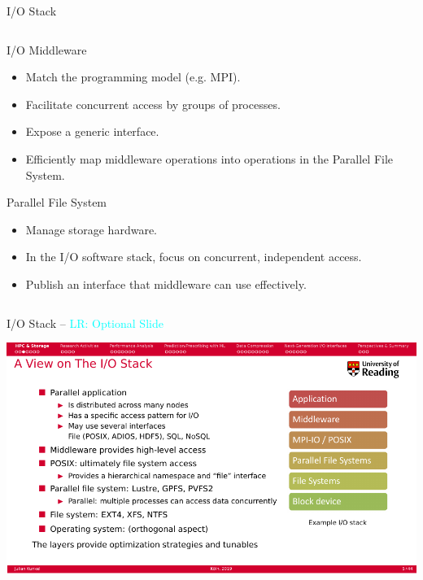 \documentclass[compress,11pt,xcolor=svgnames,aspectratio=169]{beamer}
\newcommand{\lr}[1]{\textcolor{cyan}{LR: #1}}
\begin{document}
\begin{frame}[fragile]{I/O Stack}
{\begin{columns}
\begin{column}{0.38\textwidth}
\begin{block}{I/O Middleware}
\begin{itemize}
\item Match the programming model (e.g. MPI).
\item Facilitate concurrent access by groups of processes.
\item Expose a generic interface.
\item Efficiently map middleware operations into operations in the Parallel File System.
\end{itemize}
\end{block}
\begin{block}{Parallel File System}
\begin{itemize}
\item Manage storage hardware.
\item In the I/O software stack, focus on concurrent, independent access.
\item Publish an interface that middleware can use effectively.
\end{itemize}
\end{block}
\end{column}
\end{columns}

}

\nocite{esiwace}

\end{frame}

\begin{frame}[fragile]{I/O Stack -- \lr{Optional Slide}}

\vspace*{-0.7cm}

\begin{center}
\includegraphics[scale=0.35]{fig/stack2}
\end{center}

\end{frame}
\end{document}
